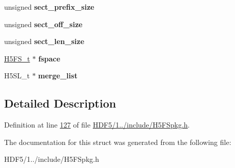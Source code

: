 \begin{DoxyCompactItemize}
unsigned {\bfseries sect\+\_\+prefix\+\_\+size}
\item 
\mbox{\label{struct_h5_f_s__sinfo__t_a6258efe6e84b282418d4b6610bc94838}} 
unsigned {\bfseries sect\+\_\+off\+\_\+size}
\item 
\mbox{\label{struct_h5_f_s__sinfo__t_a56e7207151d0ba320152564c14bc536a}} 
unsigned {\bfseries sect\+\_\+len\+\_\+size}
\item 
\mbox{\label{struct_h5_f_s__sinfo__t_ab628ba8e83220a00c902f89f9d07de7a}} 
\hyperlink{struct_h5_f_s__t}{H5\+F\+S\+\_\+t} $\ast$ {\bfseries fspace}
\item 
\mbox{\label{struct_h5_f_s__sinfo__t_a45b63a14bc135cc4bf662a9dc66580d5}} 
H5\+S\+L\+\_\+t $\ast$ {\bfseries merge\+\_\+list}
\end{DoxyCompactItemize}


\subsection{Detailed Description}


Definition at line \hyperlink{_h_d_f5_21_810_81_2include_2_h5_f_spkg_8h_source_l00127}{127} of file \hyperlink{_h_d_f5_21_810_81_2include_2_h5_f_spkg_8h_source}{H\+D\+F5/1../include/\+H5\+F\+Spkg.\+h}.



The documentation for this struct was generated from the following file\+:\begin{DoxyCompactItemize}
\item 
H\+D\+F5/1../include/\+H5\+F\+Spkg.\+h\end{DoxyCompactItemize}
